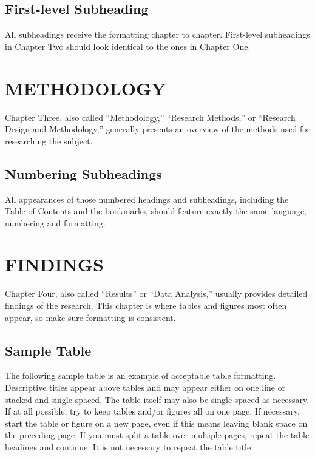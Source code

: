 \documentclass{UCF_ETD}
\begin{document}
\section{First-level Subheading}
All subheadings receive the formatting chapter to chapter. First-level subheadings in Chapter Two should look identical to the ones in Chapter One.



\chapter{METHODOLOGY}
Chapter Three, also called “Methodology,” “Research Methods,” or “Research Design and Methodology,” generally presents an overview of the methods used for researching the subject.

\section{Numbering Subheadings}
All appearances of those numbered headings and subheadings, including the Table of Contents and the bookmarks, should feature exactly the same language, numbering and formatting.






\chapter{FINDINGS}
Chapter Four, also called ``Results'' or ``Data Analysis,'' usually provides detailed findings of the research.  This chapter is where tables and figures most often appear, so make sure formatting is consistent.

\section{Sample Table}
The following sample table is an example of acceptable table formatting. Descriptive titles appear above tables and may appear either on one line or stacked and single-spaced. The table itself may also be single-spaced as necessary. If at all possible, try to keep tables and/or figures all on one page. If necessary, start the table or figure on a new page, even if this means leaving blank space on the preceding page. If you must split a table over multiple pages, repeat the table headings and continue. It is not necessary to repeat the table title.
\end{document}

